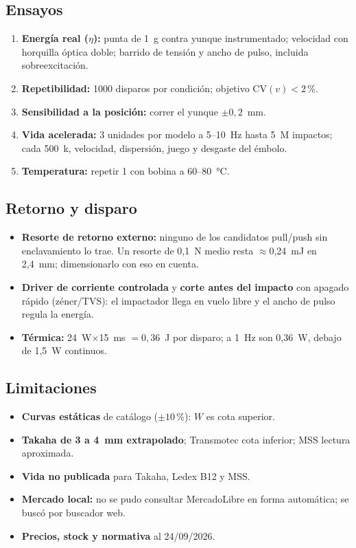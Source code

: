 \documentclass[11pt,a4paper]{article}
\begin{document}
\subsection{Ensayos}
\label{sec:ensayos}
\begin{enumerate}[leftmargin=1.4em]
  \item \textbf{Energía real ($\eta$):} punta de 1~g contra yunque instrumentado; velocidad con horquilla óptica
        doble; barrido de tensión y ancho de pulso, incluida sobreexcitación.
  \item \textbf{Repetibilidad:} 1000 disparos por condición; objetivo CV$(v)<2$\,\%.
  \item \textbf{Sensibilidad a la posición:} correr el yunque $\pm0{,}2$~mm.
  \item \textbf{Vida acelerada:} 3 unidades por modelo a 5--10~Hz hasta 5~M impactos; cada 500~k, velocidad,
        dispersión, juego y desgaste del émbolo.
  \item \textbf{Temperatura:} repetir 1 con bobina a 60--80~°C.
\end{enumerate}

\subsection{Retorno y disparo}
\begin{itemize}
  \item \textbf{Resorte de retorno externo:} ninguno de los candidatos pull/push sin enclavamiento lo trae. Un
        resorte de 0,1~N medio resta $\approx$0,24~mJ en 2,4~mm; dimensionarlo con eso en cuenta.
  \item \textbf{Driver de corriente controlada} y \textbf{corte antes del impacto} con apagado rápido (zéner/TVS): el
        impactador llega en vuelo libre y el ancho de pulso regula la energía.
  \item \textbf{Térmica:} 24~W$\times$15~ms $=0{,}36$~J por disparo; a 1~Hz son 0,36~W, debajo de 1,5~W continuos.
\end{itemize}

\subsection{Limitaciones}
\begin{itemize}
  \item \textbf{Curvas estáticas} de catálogo ($\pm10$\,\%): $W$ es cota superior.
  \item \textbf{Takaha de 3 a 4~mm extrapolado}; Transmotec cota inferior; MSS lectura aproximada.
  \item \textbf{Vida no publicada} para Takaha, Ledex B12 y MSS.
  \item \textbf{Mercado local:} no se pudo consultar MercadoLibre en forma automática; se buscó por buscador web.
  \item \textbf{Precios, stock y normativa} al 24/09/2026.
\end{itemize}
\end{document}
